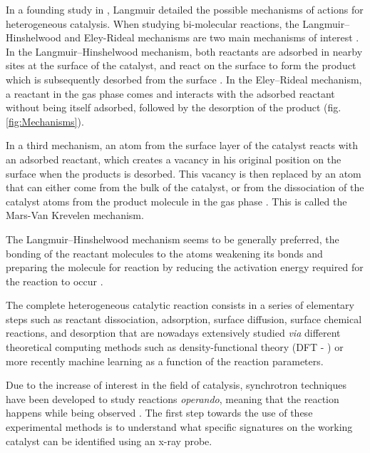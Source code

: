 In a founding study in \cite*{Langmuir1922}, Langmuir detailed the possible mechanisms of actions for heterogeneous catalysis.
When studying bi-molecular reactions, the Langmuir–Hinshelwood and Eley-Rideal mechanisms are two main mechanisms of interest \parencite{Bratan2022}.
In the Langmuir–Hinshelwood mechanism, both reactants are adsorbed in nearby sites at the surface of the catalyst, and react on the surface to form the product which is subsequently desorbed from the surface \parencite{Prins2018, ROSS2019}.
In the Eley–Rideal mechanism, a reactant in the gas phase comes and interacts with the adsorbed reactant without being itself adsorbed, followed by the desorption of the product \parencite{Rideal1939, Weinberg1996}  (fig. \ref{fig:Mechanisms}).

In a third mechanism, an atom from the surface layer of the catalyst reacts with an adsorbed reactant, which creates a vacancy in his original position on the surface when the products is desorbed.
This vacancy is then replaced by an atom that can either come from the bulk of the catalyst, or from the dissociation of the catalyst atoms from the product molecule in the gas phase \parencite{Mars1954, Doornkamp2000}.
This is called the Mars-Van Krevelen mechanism.

The Langmuir–Hinshelwood mechanism seems to be generally preferred, the bonding of the reactant molecules to the atoms weakening its bonds and preparing the molecule for reaction by reducing the activation energy required for the reaction to occur \parencite{Baxter2002}.

The complete heterogeneous catalytic reaction consists in a series of elementary steps such as reactant dissociation, adsorption, surface diffusion, surface chemical reactions, and desorption that are nowadays extensively studied \textit{via} different theoretical computing methods such as density-functional theory (DFT - \cite{Reuter2004, Molenbroek2009, Yawei2015, Gaggioli2019, Chatelier2020}) or more recently machine learning \parencite{Kitchin2018, Schlexer2019, Anstine2023} as a function of the reaction parameters.

Due to the increase of interest in the field of catalysis, synchrotron techniques have been developed to study reactions \textit{operando}, meaning that the reaction happens while being observed \parencite{Meirer2018}.
The first step towards the use of these experimental methods is to understand what specific signatures on the working catalyst can be identified using an x-ray probe.


